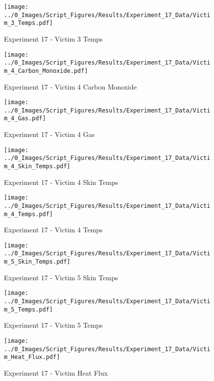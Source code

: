 	\clearpage

	\begin{figure}[H]
		\centering
		\texttt{[image: ../0\_Images/Script\_Figures/Results/Experiment\_17\_Data/Victim\_3\_Temps.pdf]}
		\caption[]{Experiment 17 - Victim 3 Temps}
	\end{figure}
 

	\begin{figure}[H]
		\centering
		\texttt{[image: ../0\_Images/Script\_Figures/Results/Experiment\_17\_Data/Victim\_4\_Carbon\_Monoxide.pdf]}
		\caption[]{Experiment 17 - Victim 4 Carbon Monoxide}
	\end{figure}
 
	\clearpage

	\begin{figure}[H]
		\centering
		\texttt{[image: ../0\_Images/Script\_Figures/Results/Experiment\_17\_Data/Victim\_4\_Gas.pdf]}
		\caption[]{Experiment 17 - Victim 4 Gas}
	\end{figure}
 

	\begin{figure}[H]
		\centering
		\texttt{[image: ../0\_Images/Script\_Figures/Results/Experiment\_17\_Data/Victim\_4\_Skin\_Temps.pdf]}
		\caption[]{Experiment 17 - Victim 4 Skin Temps}
	\end{figure}
 
	\clearpage

	\begin{figure}[H]
		\centering
		\texttt{[image: ../0\_Images/Script\_Figures/Results/Experiment\_17\_Data/Victim\_4\_Temps.pdf]}
		\caption[]{Experiment 17 - Victim 4 Temps}
	\end{figure}
 

	\begin{figure}[H]
		\centering
		\texttt{[image: ../0\_Images/Script\_Figures/Results/Experiment\_17\_Data/Victim\_5\_Skin\_Temps.pdf]}
		\caption[]{Experiment 17 - Victim 5 Skin Temps}
	\end{figure}
 
	\clearpage

	\begin{figure}[H]
		\centering
		\texttt{[image: ../0\_Images/Script\_Figures/Results/Experiment\_17\_Data/Victim\_5\_Temps.pdf]}
		\caption[]{Experiment 17 - Victim 5 Temps}
	\end{figure}
 

	\begin{figure}[H]
		\centering
		\texttt{[image: ../0\_Images/Script\_Figures/Results/Experiment\_17\_Data/Victim\_Heat\_Flux.pdf]}
		\caption[]{Experiment 17 - Victim Heat Flux}
	\end{figure}
 
